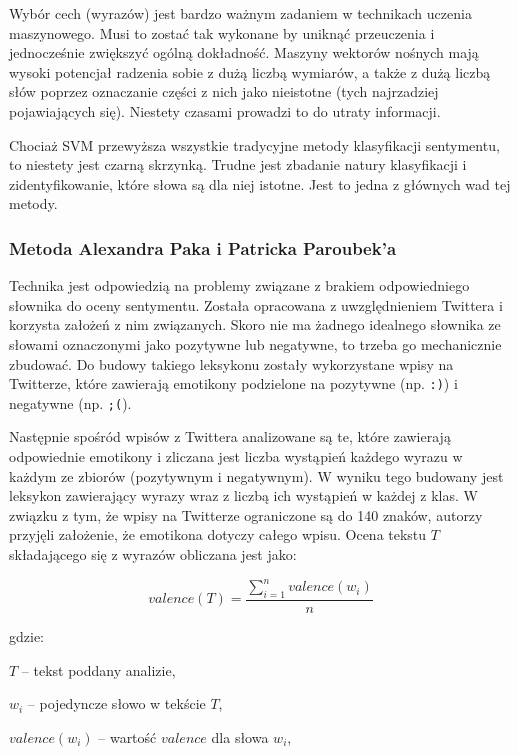 Wybór cech (wyrazów) jest bardzo ważnym zadaniem w technikach uczenia
maszynowego.
Musi to zostać tak wykonane by uniknąć przeuczenia i jednocześnie zwiększyć
ogólną dokładność. Maszyny wektorów nośnych mają wysoki potencjał radzenia sobie
z dużą liczbą wymiarów, a także z dużą liczbą słów poprzez oznaczanie części z
nich jako nieistotne (tych najrzadziej pojawiających się). Niestety czasami
prowadzi to do utraty informacji.

Chociaż SVM przewyższa wszystkie tradycyjne metody klasyfikacji sentymentu,
to niestety jest czarną skrzynką. Trudne jest zbadanie natury klasyfikacji i
zidentyfikowanie, które słowa są dla niej istotne. Jest to jedna z głównych wad
tej metody.

\subsubsection{Metoda Alexandra Paka i Patricka Paroubek'a \cite{pakParoubekSentiment}}
\label{subsubsection:pakandparoubek}
Technika jest odpowiedzią na problemy związane z brakiem odpowiedniego słownika
do oceny sentymentu. Została opracowana z uwzględnieniem Twittera i korzysta
założeń z nim związanych. Skoro nie ma żadnego idealnego słownika ze słowami
oznaczonymi jako pozytywne lub negatywne, to trzeba go mechanicznie zbudować. Do budowy takiego leksykonu zostały wykorzystane wpisy na Twitterze,
które zawierają emotikony podzielone na pozytywne (np. \texttt{:)}) i negatywne
(np. \texttt{;(}).

Następnie spośród wpisów z Twittera analizowane są te,
które zawierają odpowiednie emotikony i zliczana jest liczba wystąpień
każdego wyrazu w każdym ze zbiorów (pozytywnym i negatywnym).
W wyniku tego budowany jest leksykon zawierający wyrazy wraz z liczbą
ich wystąpień w każdej z klas.
W związku z tym, że wpisy na Twitterze ograniczone są do 140 znaków, autorzy przyjęli
założenie, że emotikona dotyczy całego wpisu. 
Ocena tekstu $T$ składającego się z wyrazów obliczana jest jako:

\begin{equation}
valence(T) = \frac{\sum\limits_{i = 1}^n valence(w_i)}{n}
\label{equation:pakparoubek}
\end{equation}

gdzie:

$T$ -- tekst poddany analizie,

$w_i$ -- pojedyncze słowo w tekście $T$,

$valence(w_i)$ -- wartość $valence$ dla słowa $w_i$,

